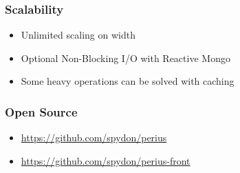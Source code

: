 \documentclass{beamer}
\begin{document}
\begin{frame}
  \frametitle{Scalability}
  \begin{itemize}
    \item{Unlimited scaling on width}
    \pause
    \item{Optional Non-Blocking I/O with Reactive Mongo}
    \pause
    \item{Some heavy operations can be solved with caching} %
  \end{itemize}
\end{frame}

\begin{frame}
  \frametitle{Open Source}
  \begin{itemize}
    \item{\url{https://github.com/spydon/perius}}
    \item{\url{https://github.com/spydon/perius-front}}
  \end{itemize}
\end{frame}

\begin{frame}
\end{frame}

\begin{frame}
\end{frame}
\end{document}
